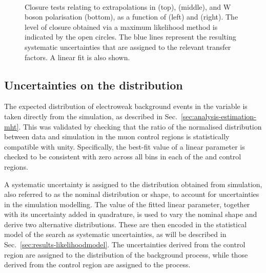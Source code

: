 \begin{figure}[t]
\\
\caption{Closure tests relating to extrapolations in \alphat (top), \bdphi 
(middle), and W boson polarisation (bottom),  as a function of \scalht (left) 
and \njet (right). The level of closure obtained via a maximum likelihood 
method is indicated by the open circles. The blue lines represent the resulting 
systematic uncertainties that are assigned to the relevant transfer factors. A 
linear fit is also shown.}
\label{fig:closuretests}
\end{figure}


\subsection{Uncertainties on the \mht distribution}
\label{sec:analysis-systematics-mht}
The expected distribution of electroweak background events in the \mht variable 
is taken directly from the simulation, as described in 
Sec.~\ref{sec:analysis-estimation-mht}. This was validated by checking that the 
ratio of the normalised distribution between data and simulation in the muon 
control 
regions is statistically compatible with unity. Specifically, the best-fit 
value of a linear parameter is checked to be consistent with zero across all 
\njnbht bins in each of the \mj and \mmj control regions.

A systematic uncertainty is assigned to the \mht distribution obtained from 
simulation, also referred to as the  
nominal \mht distribution or shape, to account for uncertainties in the 
simulation modelling. The 
value of the fitted linear parameter, together with its uncertainty added in 
quadrature, is used to vary the nominal \mht shape and derive two alternative 
distributions. These are then encoded in the statistical model of the search as 
\pmonesigma systematic uncertainties, as will be described in 
Sec.~\ref{sec:results-likelihoodmodel}. The uncertainties derived from the \mj 
control region are assigned to the \mht distribution of the \ttw background 
process, while those derived from the \mmj control region are assigned to the 
\znnj process.


